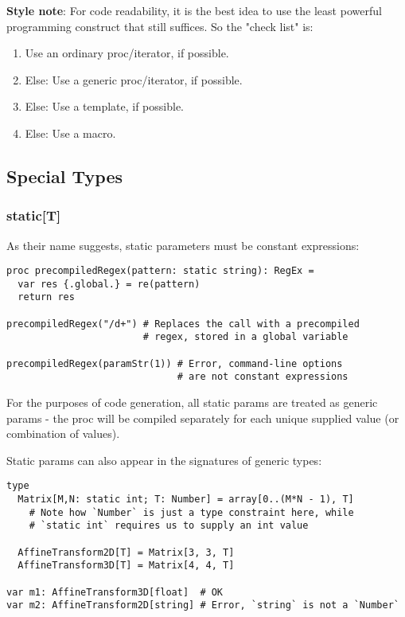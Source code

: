 \textbf{Style note}: For code readability, it is the best idea to use
the least powerful programming construct that still suffices. So the
"check list" is:

\begin{enumerate}
\def\labelenumi{(\arabic{enumi})}
\tightlist
\item
  Use an ordinary proc/iterator, if possible.
\item
  Else: Use a generic proc/iterator, if possible.
\item
  Else: Use a template, if possible.
\item
  Else: Use a macro.
\end{enumerate}

\hypertarget{special-types}{%
\subsection{Special Types}\label{special-types}}

\hypertarget{statict}{%
\subsubsection{static{[}T{]}}\label{statict}}

As their name suggests, static parameters must be constant expressions:

\begin{verbatim}
proc precompiledRegex(pattern: static string): RegEx =
  var res {.global.} = re(pattern)
  return res

precompiledRegex("/d+") # Replaces the call with a precompiled
                        # regex, stored in a global variable

precompiledRegex(paramStr(1)) # Error, command-line options
                              # are not constant expressions
\end{verbatim}

For the purposes of code generation, all static params are treated as
generic params - the proc will be compiled separately for each unique
supplied value (or combination of values).

Static params can also appear in the signatures of generic types:

\begin{verbatim}
type
  Matrix[M,N: static int; T: Number] = array[0..(M*N - 1), T]
    # Note how `Number` is just a type constraint here, while
    # `static int` requires us to supply an int value

  AffineTransform2D[T] = Matrix[3, 3, T]
  AffineTransform3D[T] = Matrix[4, 4, T]

var m1: AffineTransform3D[float]  # OK
var m2: AffineTransform2D[string] # Error, `string` is not a `Number`
\end{verbatim}

